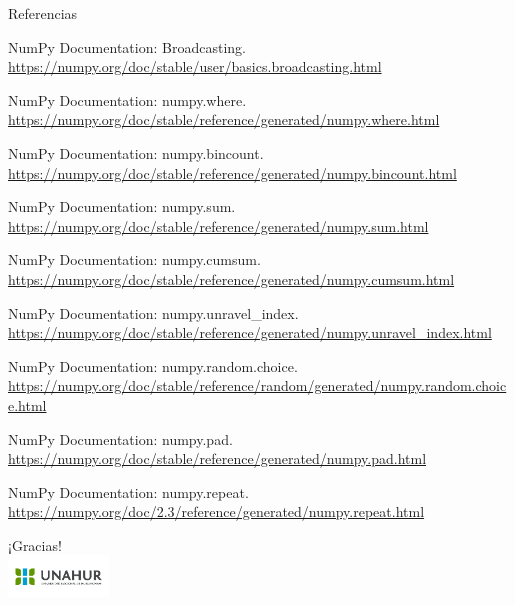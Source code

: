 \documentclass{beamer}
\begin{document}
	\begin{frame}{Referencias}
		\tiny
		\begin{thebibliography}{10}
			\beamertemplatebookbibitems
			NumPy Documentation: Broadcasting. 
			\newblock \url{https://numpy.org/doc/stable/user/basics.broadcasting.html}
			
			NumPy Documentation: numpy.where. 
			\newblock \url{https://numpy.org/doc/stable/reference/generated/numpy.where.html}
			
			NumPy Documentation: numpy.bincount. 
			\newblock \url{https://numpy.org/doc/stable/reference/generated/numpy.bincount.html}
			
			NumPy Documentation: numpy.sum. 
			\newblock \url{https://numpy.org/doc/stable/reference/generated/numpy.sum.html}
			
			NumPy Documentation: numpy.cumsum. 
			\newblock \url{https://numpy.org/doc/stable/reference/generated/numpy.cumsum.html}
			
			NumPy Documentation: numpy.unravel\_index. 
			\newblock \url{https://numpy.org/doc/stable/reference/generated/numpy.unravel_index.html}
			
			NumPy Documentation: numpy.random.choice. 
			\newblock \url{https://numpy.org/doc/stable/reference/random/generated/numpy.random.choice.html}
			
			NumPy Documentation: numpy.pad. 
			\newblock \url{https://numpy.org/doc/stable/reference/generated/numpy.pad.html}
			
			NumPy Documentation: numpy.repeat. 
			\newblock \url{https://numpy.org/doc/2.3/reference/generated/numpy.repeat.html}
		\end{thebibliography}
	\end{frame}
	
	\begin{frame}{}
		\centering
		{\huge ¡Gracias!}\\
		\vspace{1cm}
		\includegraphics[width=0.2\textwidth]{UNAHUR.png}
	\end{frame}
	
\end{document}
